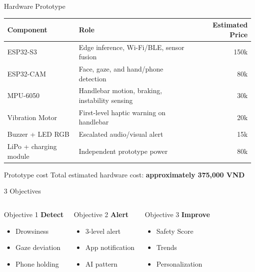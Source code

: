 \documentclass[aspectratio=169]{beamer}
\begin{document}
\begin{frame}{Hardware Prototype}
  \small
  \begin{tabularx}{\textwidth}{@{}lLr@{}}
    \toprule
    \textbf{Component} & \textbf{Role} & \textbf{Estimated Price} \\
    \midrule
    ESP32-S3 & Edge inference, Wi-Fi/BLE, sensor fusion & 150k \\
    ESP32-CAM & Face, gaze, and hand/phone detection & 80k \\
    MPU-6050 & Handlebar motion, braking, instability sensing & 30k \\
    Vibration Motor & First-level haptic warning on handlebar & 20k \\
    Buzzer + LED RGB & Escalated audio/visual alert & 15k \\
    LiPo + charging module & Independent prototype power & 80k \\
    \bottomrule
  \end{tabularx}
  \vspace{0.35cm}
  \begin{block}{Prototype cost}
    Total estimated hardware cost: \textbf{approximately 375,000 VND}
  \end{block}
\end{frame}

\begin{frame}{3 Objectives}
  \begin{columns}
    \begin{block}{Objective 1}
      \textbf{Detect}
      \begin{itemize}
        \item Drowsiness
        \item Gaze deviation
        \item Phone holding
      \end{itemize}
    \end{block}
    \begin{block}{Objective 2}
      \textbf{Alert}
      \begin{itemize}
        \item 3-level alert
        \item App notification
        \item AI pattern
      \end{itemize}
    \end{block}
    \begin{block}{Objective 3}
      \textbf{Improve}
      \begin{itemize}
        \item Safety Score
        \item Trends
        \item Personalization
      \end{itemize}
    \end{block}
  \end{columns}
\end{frame}
\end{document}
